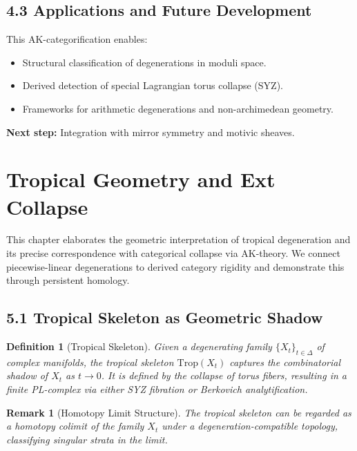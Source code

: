 \documentclass[11pt]{article}
\newtheorem{definition}[theorem]{Definition}
\newtheorem{remark}[theorem]{Remark}
\begin{document}
\subsection{4.3 Applications and Future Development}

This AK-categorification enables:
\begin{itemize}
    \item Structural classification of degenerations in moduli space.
    \item Derived detection of special Lagrangian torus collapse (SYZ).
    \item Frameworks for arithmetic degenerations and non-archimedean geometry.
\end{itemize}

\textbf{Next step:} Integration with mirror symmetry and motivic sheaves.



\section{Tropical Geometry and Ext Collapse}

This chapter elaborates the geometric interpretation of tropical degeneration and its precise correspondence with categorical collapse via AK-theory. We connect piecewise-linear degenerations to derived category rigidity and demonstrate this through persistent homology.

\subsection{5.1 Tropical Skeleton as Geometric Shadow}

\begin{definition}[Tropical Skeleton]
Given a degenerating family $\{ X_t \}_{t \in \Delta}$ of complex manifolds, the tropical skeleton $\mathrm{Trop}(X_t)$ captures the combinatorial shadow of $X_t$ as $t \to 0$. It is defined by the collapse of torus fibers, resulting in a finite PL-complex via either SYZ fibration or Berkovich analytification.
\end{definition}

\begin{remark}[Homotopy Limit Structure]
The tropical skeleton can be regarded as a homotopy colimit of the family $X_t$ under a degeneration-compatible topology, classifying singular strata in the limit.
\end{remark}
\end{document}
